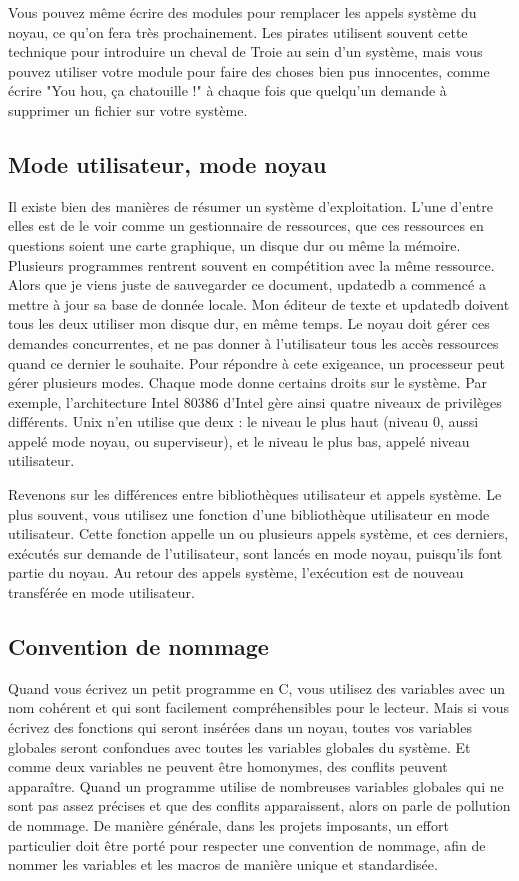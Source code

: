 \documentclass[11pt]{article}
\begin{document}
Vous pouvez même écrire des modules pour remplacer les appels système du noyau, ce qu'on fera très prochainement. Les pirates utilisent souvent cette technique pour introduire un cheval de Troie au sein d'un système, mais vous pouvez utiliser votre module pour faire des choses bien pus innocentes, comme écrire "You hou, ça chatouille !" à chaque fois que quelqu'un demande à supprimer un fichier sur votre système.

\subsection*{Mode utilisateur, mode noyau}
\label{sec-5-3}

Il existe bien des manières de résumer un système d'exploitation. L'une d'entre elles est de le voir comme un gestionnaire de ressources, que ces ressources en questions soient une carte graphique, un disque dur ou même la mémoire. Plusieurs programmes rentrent souvent en compétition avec la même ressource. Alors que je viens juste de sauvegarder ce document, updatedb a commencé a mettre à jour sa base de donnée locale. Mon éditeur de texte et updatedb doivent tous les deux utiliser mon disque dur, en même temps. Le noyau doit gérer ces demandes concurrentes, et ne pas donner à l'utilisateur tous les accès ressources quand ce dernier le souhaite. Pour répondre à cete exigeance, un processeur peut gérer plusieurs modes. Chaque mode donne certains droits sur le système. Par exemple, l'architecture Intel 80386 d'Intel gère ainsi quatre niveaux de privilèges différents. Unix n'en utilise que deux : le niveau le plus haut (niveau 0, aussi appelé mode noyau, ou superviseur), et le niveau le plus bas, appelé niveau utilisateur.

Revenons sur les différences entre bibliothèques utilisateur et appels système. Le plus souvent, vous utilisez une fonction d'une bibliothèque utilisateur en mode utilisateur. Cette fonction appelle un ou plusieurs appels système, et ces derniers, exécutés sur demande de l'utilisateur, sont lancés en mode noyau, puisqu'ils font partie du noyau. Au retour des appels système, l'exécution est de nouveau transférée en mode utilisateur.

\subsection*{Convention de nommage}
\label{sec-5-4}

Quand vous écrivez un petit programme en C, vous utilisez des variables avec un nom cohérent et qui sont facilement compréhensibles pour le lecteur. Mais si vous écrivez des fonctions qui seront insérées dans un noyau, toutes vos variables globales seront confondues avec toutes les variables globales du système. Et comme deux variables ne peuvent être homonymes, des conflits peuvent apparaître. Quand un programme utilise de nombreuses variables globales qui ne sont pas assez précises et que des conflits apparaissent, alors on parle de pollution de nommage. De manière générale, dans les projets imposants, un effort particulier doit être porté pour respecter une convention de nommage, afin de nommer les variables et les macros de manière unique et standardisée.
\end{document}
